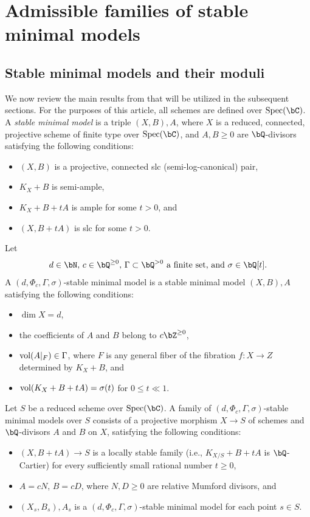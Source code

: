 \documentclass[11pt,letterpaper]{amsart}
\numberwithin{equation}{section}
\begin{document}
	\section{Admissible families of stable minimal models}\label{section_boundedness}	
	\subsection{Stable minimal models and their moduli}\label{section_moduli}
	We now review the main results from \cite{Birkar2022} that will be utilized in the subsequent sections. For the purposes of this article, all schemes are defined over ${\rm Spec}(\bC)$. A \emph{stable minimal model} is a triple $(X, B), A$, where $X$ is a reduced, connected, projective scheme of finite type over ${\rm Spec}(\bC)$, and $A, B \geq 0$ are $\bQ$-divisors satisfying the following conditions:  
	\begin{itemize}  
		\item $(X, B)$ is a projective, connected slc (semi-log-canonical) pair,  
		\item $K_X + B$ is semi-ample,  
		\item $K_X + B + tA$ is ample for some $t > 0$, and  
		\item $(X, B + tA)$ is slc for some $t > 0$.  
	\end{itemize}  
	Let  
	$$
	d \in \bN, \, c \in \bQ^{\geq 0}, \, \Gamma \subset \bQ^{>0} \text{ a finite set, and } \sigma \in \bQ[t].
	$$  
	A $(d, \Phi_c, \Gamma, \sigma)$-stable minimal model is a stable minimal model $(X, B), A$ satisfying the following conditions:  
	\begin{itemize}  
		\item $\dim X = d$,  
		\item the coefficients of $A$ and $B$ belong to $c \bZ^{\geq 0}$,  
		\item ${\rm vol}(A|_F) \in \Gamma$, where $F$ is any general fiber of the fibration $f: X \to Z$ determined by $K_X + B$, and  
		\item ${\rm vol}(K_X + B + tA) = \sigma(t)$ for $0 \leq t \ll 1$.  
	\end{itemize}  
	Let $S$ be a reduced scheme over ${\rm Spec}(\bC)$. A family of $(d, \Phi_c, \Gamma, \sigma)$-stable minimal models over $S$ consists of a projective morphism $X \to S$ of schemes and $\bQ$-divisors $A$ and $B$ on $X$, satisfying the following conditions:  
	\begin{itemize}  
		\item $(X, B + tA) \to S$ is a locally stable family (i.e., $K_{X/S} + B + tA$ is $\bQ$-Cartier) for every sufficiently small rational number $t \geq 0$,  
		\item $A = cN$, $B = cD$, where $N, D \geq 0$ are relative Mumford divisors, and  
		\item $(X_s, B_s), A_s$ is a $(d, \Phi_c, \Gamma, \sigma)$-stable minimal model for each point $s \in S$.  
	\end{itemize} 
\end{document}
